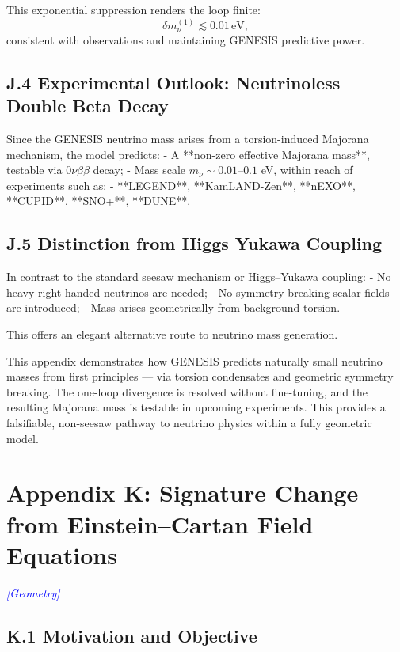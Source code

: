 \documentclass{article}
\newcommand{\geometrytag}{\textcolor{blue}{\textit{[Geometry]}}}
\begin{document}
This exponential suppression renders the loop finite:
\begin{equation}\label{eq:auto218}
\delta m_\nu^{(1)} \lesssim 0.01\,\text{eV},
\end{equation}
consistent with observations and maintaining GENESIS predictive power.

\subsection*{J.4 Experimental Outlook: Neutrinoless Double Beta Decay}
Since the GENESIS neutrino mass arises from a torsion-induced Majorana mechanism, the model predicts:
- A **non-zero effective Majorana mass**, testable via $0\nu\beta\beta$ decay;
- Mass scale $m_\nu \sim 0.01$–$0.1$ eV, within reach of experiments such as:
  - **LEGEND**, **KamLAND-Zen**, **nEXO**, **CUPID**, **SNO+**, **DUNE**.

\subsection*{J.5 Distinction from Higgs Yukawa Coupling}
In contrast to the standard seesaw mechanism or Higgs–Yukawa coupling:
- No heavy right-handed neutrinos are needed;
- No symmetry-breaking scalar fields are introduced;
- Mass arises geometrically from background torsion.

This offers an elegant alternative route to neutrino mass generation.

\begin{tcolorbox}[colback=gray!5, colframe=black!30, title=Why this matters]
This appendix demonstrates how GENESIS predicts naturally small neutrino masses from first principles — via torsion condensates and geometric symmetry breaking. The one-loop divergence is resolved without fine-tuning, and the resulting Majorana mass is testable in upcoming experiments. This provides a falsifiable, non-seesaw pathway to neutrino physics within a fully geometric model.
\end{tcolorbox}


\section*{Appendix K: Signature Change from Einstein–Cartan Field Equations}
\label{app:signature-change}
\geometrytag


\subsection*{K.1 Motivation and Objective}
\end{document}
